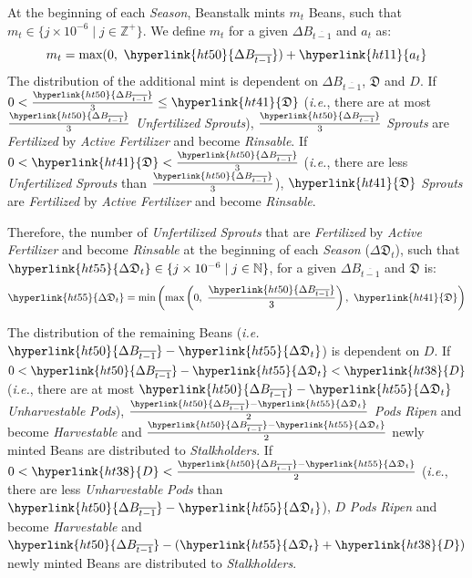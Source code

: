 \documentclass[tikz]{article}
\newcommand{\term}[1]{\textsl{#1}}
\begin{document}
At the beginning of each \term{Season}, Beanstalk mints $m_t$ Beans, such that $m_t \in \{j \times 10^{-6} \mid j \in \mathbb{Z}^{+} \}$.
We define $m_t$ for a given \hyperlink{ht50}{$\Delta B_{\overline{t-1}}$} and \hyperlink{ht11}{$a_t$} as:
$$m_t = \text{max}(0,\ \hyperlink{ht50}{\Delta B_{\overline{t-1}}}) + \hyperlink{ht11}{a_t}$$
The distribution of the additional mint is dependent on \hyperlink{ht50}{$\Delta B_{\overline{t-1}}$}, \hyperlink{ht41}{$\mathfrak{D}$} and \hyperlink{ht38}{$D$}. If $0 < \frac{\hyperlink{ht50}{\Delta B_{\overline{t-1}}}}{3} \leq \hyperlink{ht41}{\mathfrak{D}}$ (\term{i.e.}, there are at most $\frac{\hyperlink{ht50}{\Delta B_{\overline{t-1}}}}{3}$ \term{Unfertilized} \term{Sprouts}), $\frac{\hyperlink{ht50}{\Delta B_{\overline{t-1}}}}{3}$ \term{Sprouts} are \term{Fertilized} by \term{Active} \term{Fertilizer} and become \term{Rinsable}. If $0 < \hyperlink{ht41}{\mathfrak{D}} < \frac{\hyperlink{ht50}{\Delta B_{\overline{t-1}}}}{3}$ (\term{i.e.}, there are less \term{Unfertilized} \term{Sprouts} than $\frac{\hyperlink{ht50}{\Delta B_{\overline{t-1}}}}{3}$), $\hyperlink{ht41}{\mathfrak{D}}$ \term{Sprouts} are \term{Fertilized} by \term{Active} \term{Fertilizer} and become \term{Rinsable}.

Therefore, the number of \term{Unfertilized} \term{Sprouts} that are \term{Fertilized} by \term{Active} \term{Fertilizer} and become \term{Rinsable} at the beginning of each \term{Season} (\hyperlink{ht55}{$\Delta \mathfrak{D}_t$}), such that $\hyperlink{ht55}{\Delta \mathfrak{D}_t} \in \{j \times 10^{-6} \mid j \in \mathbb{N} \}$, for a given \hyperlink{ht50}{$\Delta B_{\overline{t-1}}$} and \hyperlink{ht41}{$\mathfrak{D}$} is:
$$\hyperlink{ht55}{\Delta \mathfrak{D}_t} = \text{min}\left(\text{max}\left(0,\ \frac{\hyperlink{ht50}{\Delta B_{\overline{t-1}}}}{3}\right),\ \hyperlink{ht41}{\mathfrak{D}}\right)$$

The distribution of the remaining Beans (\term{i.e. $\hyperlink{ht50}{\Delta B_{\overline{t-1}}} - \hyperlink{ht55}{\Delta \mathfrak{D}_t}$}) is dependent on \hyperlink{ht38}{$D$}. If $0 < \hyperlink{ht50}{\Delta B_{\overline{t-1}}} - \hyperlink{ht55}{\Delta \mathfrak{D}_t} < \hyperlink{ht38}{D}$ (\term{i.e.}, there are at most $\hyperlink{ht50}{\Delta B_{\overline{t-1}}} - \hyperlink{ht55}{\Delta \mathfrak{D}_t}$ \term{Unharvestable} \term{Pods}), $\frac{\hyperlink{ht50}{\Delta B_{\overline{t-1}}} - \hyperlink{ht55}{\Delta \mathfrak{D}_t}}{2}$ \term{Pods} \term{Ripen} and become \term{Harvestable} and $\frac{\hyperlink{ht50}{\Delta B_{\overline{t-1}}} - \hyperlink{ht55}{\Delta \mathfrak{D}_t}}{2}$ newly minted Beans are distributed to \term{Stalkholders}. If $0 < \hyperlink{ht38}{D} < \frac{\hyperlink{ht50}{\Delta B_{\overline{t-1}}} - \hyperlink{ht55}{\Delta \mathfrak{D}_t}}{2}$ (\term{i.e.}, there are less \term{Unharvestable} \term{Pods} than $\hyperlink{ht50}{\Delta B_{\overline{t-1}}} - \hyperlink{ht55}{\Delta \mathfrak{D}_t}$), \hyperlink{ht38}{$D$} \term{Pods} \term{Ripen} and become \term{Harvestable} and $\hyperlink{ht50}{\Delta B_{\overline{t-1}}} - (\hyperlink{ht55}{\Delta \mathfrak{D}_t} + \hyperlink{ht38}{D})$ newly minted Beans are distributed to \term{Stalkholders}.
\end{document}
